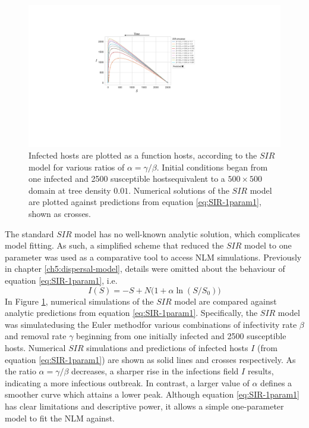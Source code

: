 \label{A:sir-fitting}
\begin{figure}
    \centering
    \includegraphics[scale=0.54]{chapter5/figures/fig2-sir-fitting-A.pdf}
    \caption{Infected hosts are plotted as a function hosts, according to the $SIR$ model for various ratios of $\alpha=\gamma / \beta$.
            Initial conditions began from one infected and 2500 susceptible hosts\textemdash equivalent to a $500\times500$ domain at tree density $0.01$.
            Numerical solutions of the $SIR$ model are plotted against predictions from equation \ref{eq:SIR-1param1}, shown as crosses.}
    \label{fig:sir-fitting-a}
\end{figure}

The standard $SIR$ model has no well-known analytic solution, which complicates model fitting.
As such, a simplified scheme that reduced the $SIR$ model to one parameter was used as a comparative tool to access NLM simulations.
Previously in chapter \ref{ch5:dispersal-model}, details were omitted about the behaviour of equation \ref{eq:SIR-1param1}, i.e.
\[
I(S) = -S +  N \Big( 1 + \alpha \ln(S / S_0) \Big)
\]
In Figure \ref{fig:sir-fitting-a}, numerical simulations of the $SIR$ model are compared against analytic predictions from equation \ref{eq:SIR-1param1}.
Specifically, the $SIR$ model was simulated\textemdash using the Euler method\textemdash for various combinations of infectivity rate $\beta$ and removal rate $\gamma$ beginning from
one initially infected and 2500 susceptible hosts.
Numerical $SIR$ simulations and predictions of infected hosts $I$ (from equation \ref{eq:SIR-1param1}) are shown as solid lines and crosses respectively.
As the ratio $\alpha=\gamma/\beta$ decreases, a sharper rise in the infections field $I$ results, indicating a more infectious outbreak.
In contrast, a larger value of $\alpha$ defines a smoother curve which attains a lower peak.
Although equation \ref{eq:SIR-1param1} has clear limitations and descriptive power, it allows a simple one-parameter model to fit the NLM against.


